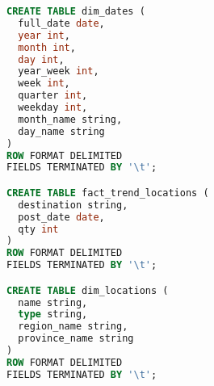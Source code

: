 \begin{lstlisting}[language=SQL,basicstyle=\tiny,caption=Kueri Hive]
CREATE TABLE dim_dates (
  full_date date,
  year int,
  month int,
  day int,
  year_week int,
  week int,
  quarter int,
  weekday int,
  month_name string,
  day_name string
)
ROW FORMAT DELIMITED
FIELDS TERMINATED BY '\t';

CREATE TABLE fact_trend_locations (
  destination string,
  post_date date,
  qty int
)
ROW FORMAT DELIMITED
FIELDS TERMINATED BY '\t';

CREATE TABLE dim_locations (
  name string,
  type string,
  region_name string,
  province_name string
)
ROW FORMAT DELIMITED
FIELDS TERMINATED BY '\t';
\end{lstlisting}